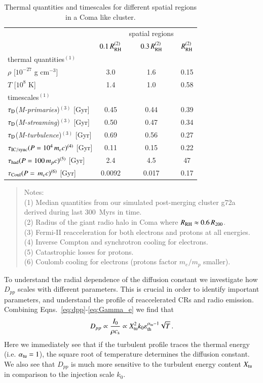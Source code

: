 \documentclass[fleqn,usenatbib,useAMS]{mnras}
\newcommand{\Mstream}{{\it M-streaming}\xspace}
\newcommand{\Mflatturb}{{\it M-turbulence}\xspace}
\newcommand{\Mprimary}{{\it M-primaries}\xspace}
\newcommand{\RH}{R_\rmn{RH}}
\newcommand{\eps}{\varepsilon}
\begin{document}
\begin{table}
  \caption{Thermal quantities and timescales for different spatial
    regions in a Coma like cluster.}
\begin{tabular}{l c  c c}
\hline
\hline
& & spatial regions & \\
 & $0.1\,\RH^{(2)}$ & $0.3\,\RH^{(2)}$ & $\RH^{(2)}$   \\
\hline
thermal quantities$^{(1)}$ & & & \\
$\rho$ [$10^{-27}$ g cm$^{-3}$] & 3.0 & 1.6 & 0.15 \\
$T$ [$10^{8}$ K] & 1.4 & 1.0 & 0.58 \\
\hline
timescales$^{(1)}$ & & & \\
$\tau_{\mathrm{D}}$(\Mprimary)$^{(3)}$ [Gyr] & 0.45 & 0.44 & 0.39 \\
$\tau_{\mathrm{D}}$(\Mstream)$^{(3)}$  [Gyr] & 0.50 & 0.47 & 0.34 \\
$\tau_{\mathrm{D}}$(\Mflatturb)$^{(3)}$  [Gyr] & 0.69 & 0.56 & 0.27 \\
$\tau_{\mathrm{IC/sync}}(P=10^4\,m_ec)^{(4)}$ [Gyr] & 0.11 & 0.15 & 0.22 \\
$\tau_{\mathrm{had}}(P=100\,m_pc)^{(5)}$ [Gyr] & 2.4 & 4.5 & 47 \\
$\tau_{\mathrm{Coul}}(P=\,m_ec)^{(6)}$  [Gyr] & 0.0092 & 0.017 & 0.17 \\
\hline
\end{tabular}
\begin{quote}
 Notes: \\ 
 (1) Median quantities from our simulated post-merging cluster g72a derived 
 during last 300~Myrs in time. \\
 (2) Radius of the giant radio halo in Coma where $\RH\approx0.6\,R_{200}$.\\
 (3) Fermi-II reacceleration for both electrons and protons at all energies.\\
 (4) Inverse Compton and synchrotron cooling for electrons.\\
 (5) Catastrophic losses for protons.\\
 (6) Coulomb cooling for electrons (protons factor $m_e/m_p$ smaller).\\
 \label{tab:timescales}
  \end{quote}
\end{table} 


To understand the radial dependence of the diffusion constant we
investigate how $D_{pp}$ scales with different parameters. This is
crucial in order to identify important parameters, and understand the
profile of reaccelerated CRs and radio emission. Combining
Eqns.~\ref{eq:dpp}-\ref{eq:Gamma_e} we find that 
\begin{equation}
  \label{eq:Dpp_scaling}
  D_{pp}\propto \frac{I_0}{\rho c_{\rmn{s}}} \propto 
X_\rmn{tu}^2k_0\eps_\rmn{th}^{\alpha_\rmn{tu}-1}\sqrt{T}\,.
\end{equation}
Here we immediately see that if the turbulent profile traces the
thermal energy (i.e. $\alpha_{\mathrm{tu}}=1$), the square root of
temperature determines the diffusion constant. We also see that
$D_{pp}$ is much more sensitive to the turbulent energy content
$X_{\mathrm{tu}}$ in comparison to the injection scale $k_0$.
\end{document}
